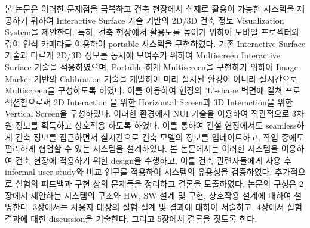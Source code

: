 

본 논문은 이러한 문제점을 극복하고 건축 현장에서 실제로 활용이 가능한 시스템을 제공하기 위하여 Interactive Surface 기술\cite{grossman__2010} 기반의 2D/3D 건축 정보 Visualization System을 제안한다. 특히, 건축 현장에서 활용도를 높이기 위하여 모바일 프로젝터와 깊이 인식 카메라를 이용하여 portable 시스템을 구현하였다. 기존 Interactive Surface 기술과 다르게 2D/3D 정보를 동시에 보여주기 위하여 Multiscreen Interactive Surface 기술을 적용하였으며, Portable 하게 Multiscreen을 구현하기 위하여 Image Marker 기반의 Calibration 기술을 개발하여 미리 설치된 환경이 아니라 실시간으로 Multiscreen을 구성하도록 하였다. 이를 이용하여 현장의 'L'-shape 벽면에 걸쳐 프로젝션함으로써 2D Interaction 을 위한 Horizontal Screen과 3D Interaction을 위한 Vertical Screen을 구성하였다. 이러한 환경에서 NUI 기술을 이용하여 직관적으로 3차원 정보를 획득하고 상호작용 하도록 하였다. 이를 통하여 건설 현장에서도 seamless하게 건축 정보를 접근하면서 실시간으로 건축 모델의 정보를 업데이트하고, 작업 중에도 편리하게 협업할 수 있는 시스템을 설계하였다. 본 논문에서는 이러한 시스템을 이용하여 건축 현장에 적용하기 위한 design을 수행하고, 이를 건축 관련자들에게 사용 후 informal user study와 비교 연구를 적용하여 시스템의 유용성을 검증하였다. 추가적으로 실험의 피드백과 구현 상의 문제들을 정리하고 결론을 도출하였다.
논문의 구성은 2장에서 제안하는 시스템의 구조와 HW, SW 설계 및 구현, 상호작용 설계에 대하여 설명한다. 3장에서는 사용자 대상의 실험 설계 및 결과에 대하여 서술하고, 4장에서 실험 결과에 대한 discussion을 기술한다. 그리고 5장에서 결론을 짓도록 한다.
